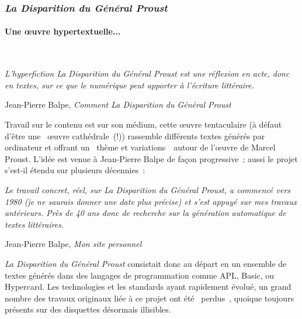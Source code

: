 \documentclass{article}
\newcommand{\subsubsubsection}[1]{\paragraph{#1}\mbox{}\\}
\newenvironment{citationbox}
{\begin{center}
		\begin{minipage}{.8\textwidth}
		}
		{
		\end{minipage}	
\end{center}
}
\begin{document}
			\subsubsection{\textit{La Disparition du Général Proust}}
				\subsubsubsection{Une œuvre hypertextuelle...}
					\begin{citationbox}
						\textit{L'hyperfiction \textit{La Disparition du Général Proust} est une réflexion en acte, donc en textes, sur ce que le numérique peut apporter à l'écriture littéraire.}
						\begin{flushright}
							Jean-Pierre Balpe, \textit{Comment La Disparition du Général Proust} \autocite{balpe_blog}
						\end{flushright}
					\end{citationbox}
					Travail sur le contenu est sur son médium, cette œuvre tentaculaire (à défaut d'être une \guillemotleft~œuvre cathédrale~\guillemotright(!)) rassemble différents textes générés par ordinateur et offrant un \guillemotleft~thème et variations~\guillemotright~autour de l'œuvre de Marcel Proust. L'idée est venue à Jean-Pierre Balpe de façon progressive ; aussi le projet s'est-il étendu sur plusieurs décennies :
					\begin{citationbox}
						\textit{Le travail concret, réel, sur \textit{La Disparition du Général Proust}, a commencé vers 1980 (je ne saurais donner une date plus précise) et s'est appuyé sur mes travaux antérieurs. Près de 40 ans donc de recherche sur la génération automatique de textes littéraires.}
						\begin{flushright}
							Jean-Pierre Balpe, \textit{Mon site personnel} \autocite{balpe_blog}
						\end{flushright}
					\end{citationbox}
					\textit{La Disparition du Général Proust} consistait donc au départ en un ensemble de textes générés  dans  des langages de programmation comme APL, Basic, ou Hypercard. Les technologies et les standards ayant rapidement évolué, un grand nombre des travaux originaux liée à ce projet ont été \guillemotleft~perdus~\guillemotright,  quoique toujours présents sur des disquettes désormais illisibles.\\
					
\end{document}
